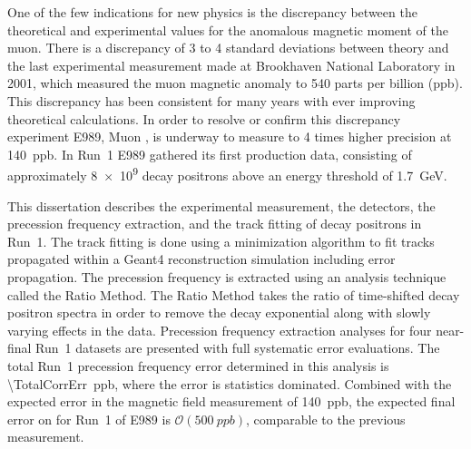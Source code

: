 


One of the few indications for new physics is the discrepancy between the theoretical and experimental values for the anomalous magnetic moment of the muon. There is a discrepancy of 3 to 4 standard deviations between theory and the last experimental measurement made at Brookhaven National Laboratory in 2001, which measured the muon magnetic anomaly \amu to 540 parts per billion (ppb). This discrepancy has been consistent for many years with ever improving theoretical calculations. In order to resolve or confirm this discrepancy experiment E989, Muon \gmtwo, is underway to measure \amu to 4 times higher precision at \SI{140}{ppb}. In Run~1 E989 gathered its first production data, consisting of approximately \SI{8e9}{} decay positrons above an energy threshold of \SI{1.7}{\GeV}.

This dissertation describes the experimental measurement, the detectors, the precession frequency extraction, and the track fitting of decay positrons in Run~1. The track fitting is done using a \chisq minimization algorithm to fit tracks propagated within a Geant4 reconstruction simulation including error propagation. The precession frequency is extracted using an analysis technique called the Ratio Method. The Ratio Method takes the ratio of time-shifted decay positron spectra in order to remove the decay exponential along with slowly varying effects in the data. Precession frequency extraction analyses for four near-final Run~1 datasets are presented with full systematic error evaluations. The total Run~1 precession frequency error determined in this analysis is \SI{\TotalCorrErr}{ppb}, where the error is statistics dominated. Combined with the expected error in the magnetic field measurement of \SI{140}{ppb}, the expected final error on \amu for Run~1 of E989 is $\mathcal{O}(\SI{500}{ppb})$, comparable to the previous measurement.






